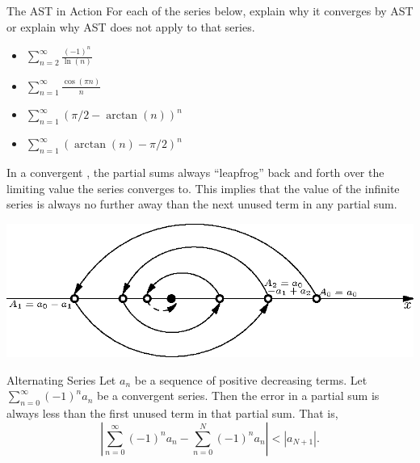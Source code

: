 \begin{exercise}{The AST in Action \Coffeecup \Coffeecup}
For each of the series below, explain why it converges by AST or explain why AST does not apply to that series.
\begin{itemize}
\item $\sum_{n=2}^\infty \frac{(-1)^n}{\ln(n)}$
\vspace*{1in}
\item  $\sum_{n=1}^\infty \frac{\cos(\pi n)}{n}$
\vspace*{1in}
\item  $\sum_{n=1}^\infty \left(\pi/2-\arctan(n)\right)^n$
\vspace*{1in}
\item  $\sum_{n=1}^\infty \left(\arctan(n)-\pi/2\right)^n$
\vspace*{1in}

\end{itemize} 
\end{exercise}

In a convergent , the partial sums always ``leapfrog'' back and forth over the limiting value the series converges to.  This implies that the value of the infinite series is always no further away than the next unused term in any partial sum.

\begin{center}
	\includegraphics{ChapterSeqSer/Figures/CAS}
\end{center}

\begin{theorem}{Alternating Series }
Let $a_n$ be a sequence of positive decreasing terms.  Let $\sum_{n=0}^\infty (-1)^na_n$ be a convergent series.  Then the error in a partial sum is always less than the first unused term in that partial sum.  That is, $$\left|\sum_{n=0}^\infty (-1)^na_n - \sum_{n=0}^N (-1)^na_n\right|<|a_{N+1}|. $$
\end{theorem}

